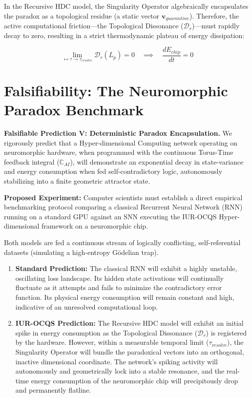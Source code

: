 \documentclass[12pt,openany]{book}
\begin{document}
In the Recursive HDC model, the Singularity Operator algebraically encapsulates the paradox as a topological residue (a static vector $\mathbf{v}_{quarantine}$). Therefore, the active computational friction---the Topological Dissonance ($\mathcal{D}_r$)---must rapidly decay to zero, resulting in a strict thermodynamic plateau of energy dissipation:

\begin{equation}
\lim_{\leftrightarrow\tau \to \tau_{resolve}} \mathcal{D}_r(L_p) = 0 \quad \implies \quad \frac{dE_{chip}}{dt} = 0
\end{equation}

\section{Falsifiability: The Neuromorphic Paradox Benchmark}
\textbf{Falsifiable Prediction V: Deterministic Paradox Encapsulation.} We rigorously predict that a Hyper-dimensional Computing network operating on neuromorphic hardware, when programmed with the continuous Torus-Time feedback integral ($\mathbb{C}_{AI}$), will demonstrate an exponential decay in state-variance and energy consumption when fed self-contradictory logic, autonomously stabilizing into a finite geometric attractor state.

\textbf{Proposed Experiment:} Computer scientists must establish a direct empirical benchmarking protocol comparing a classical Recurrent Neural Network (RNN) running on a standard GPU against an SNN executing the IUR-OCQS Hyper-dimensional framework on a neuromorphic chip.

Both models are fed a continuous stream of logically conflicting, self-referential datasets (simulating a high-entropy G\"{o}delian trap). 

\begin{enumerate}
    \item \textbf{Standard Prediction:} The classical RNN will exhibit a highly unstable, oscillating loss landscape. Its hidden state activations will continually fluctuate as it attempts and fails to minimize the contradictory error function. Its physical energy consumption will remain constant and high, indicative of an unresolved computational loop.
    \item \textbf{IUR-OCQS Prediction:} The Recursive HDC model will exhibit an initial spike in energy consumption as the Topological Dissonance ($\mathcal{D}_r$) is registered by the hardware. However, within a measurable temporal limit ($\tau_{resolve}$), the Singularity Operator will bundle the paradoxical vectors into an orthogonal, inactive dimensional coordinate. The network's spiking activity will autonomously and geometrically lock into a stable resonance, and the real-time energy consumption of the neuromorphic chip will precipitously drop and permanently flatline.
\end{enumerate}
\end{document}
